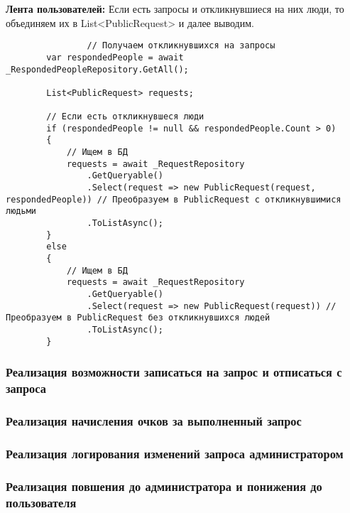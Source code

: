 \textbf{Лента пользователей:}  Если есть запросы и откликнувшиеся на них люди, то объединяем их в List<PublicRequest> и далее выводим.
\begin{verbatim}
				// Получаем откликнувшихся на запросы
        var respondedPeople = await _RespondedPeopleRepository.GetAll();

        List<PublicRequest> requests;

        // Если есть откликнувшеся люди
        if (respondedPeople != null && respondedPeople.Count > 0)
        {
            // Ищем в БД
            requests = await _RequestRepository
                .GetQueryable()
                .Select(request => new PublicRequest(request, respondedPeople)) // Преобразуем в PublicRequest с откликнувшимися людьми
                .ToListAsync();
        }
        else
        {
            // Ищем в БД
            requests = await _RequestRepository
                .GetQueryable()
                .Select(request => new PublicRequest(request)) // Преобразуем в PublicRequest без откликнувшихся людей
                .ToListAsync();
        }
\end{verbatim}

\subsubsection{Реализация возможности записаться на запрос и отписаться с запроса}

\subsubsection{Реализация начисления очков за выполненный запрос}

\subsubsection{Реализация логирования изменений запроса администратором}

\subsubsection{Реализация повшения до администратора и понижения до пользователя}
